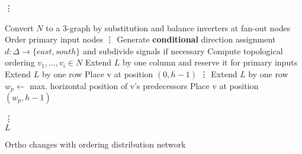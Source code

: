 \begin{algorithm}[H]
	\vdots
	
	\begin{algorithmic}
		\State Convert $N$ to a 3-graph by substitution and balance inverters at fan-out nodes
		\State Order primary input nodes
		\State \vdots
		\State Generate \textbf{conditional} direction assignment $d : \Delta \rightarrow \{east, south\}$ and subdivide signals if necessary
		\State Compute topological ordering $v_1, . . . , v_i \in N$
		\State Extend $L$ by one column and reserve it for primary inputs
		\State Extend $L$ by one row
		\State Place v at position $(0, h - 1)$
		\State \vdots
		\State Extend $L$ by one row
		\EndIf
		\State $w_p \leftarrow$ max. horizontal position of v's predecessors
		\State Place v at position $(w _p, h - 1)$
		\EndIf
		
		\EndFor
		\State \vdots \\
		\Return $L$
	\end{algorithmic}
	\caption{Ortho changes with ordering distribution network}\label{alg:input_network}
\end{algorithm}

